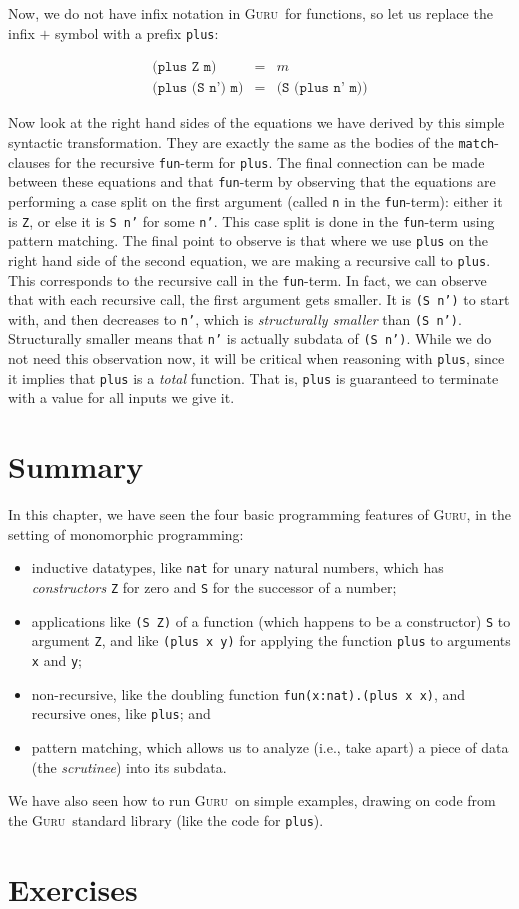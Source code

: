 \documentclass{book}[12pt]
\newcommand{\guru}[0]{\textsc{Guru}}
\begin{document}
\noindent Now, we do not have infix notation in \guru\ for functions,
so let us replace the infix $+$ symbol with a prefix \texttt{plus}:

\begin{eqnarray*}
\texttt{(plus Z m)} & = & m \\
\texttt{(plus (S n') m)} & = & \texttt{(S (plus n' m))}
\end{eqnarray*}

\noindent Now look at the right hand sides of the equations we have
derived by this simple syntactic transformation.  They are exactly the
same as the bodies of the \texttt{match}-clauses for the recursive
\texttt{fun}-term for \texttt{plus}.  The final connection can be made
between these equations and that \texttt{fun}-term by observing that
the equations are performing a case split on the first argument
(called \texttt{n} in the \texttt{fun}-term): either it is \texttt{Z},
or else it is \texttt{S n'} for some \texttt{n'}.  This case split is
done in the \texttt{fun}-term using pattern matching.  The final point
to observe is that where we use \texttt{plus} on the right hand side
of the second equation, we are making a recursive call to
\texttt{plus}.  This corresponds to the recursive call in the
\texttt{fun}-term.  In fact, we can observe that with each recursive
call, the first argument gets smaller.  It is \texttt{(S n')} to start
with, and then decreases to \texttt{n'}, which is \emph{structurally
smaller} than \texttt{(S n')}.  Structurally smaller means that
\texttt{n'} is actually subdata of \texttt{(S n')}.  While we do not
need this observation now, it will be critical when reasoning with
\texttt{plus}, since it implies that \texttt{plus} is a \emph{total}
function.  That is, \texttt{plus} is guaranteed to terminate with a
value for all inputs we give it.

\section{Summary}

In this chapter, we have seen the four basic programming features of
\guru, in the setting of monomorphic programming:
\begin{itemize}
\item inductive datatypes, like \texttt{nat} for unary natural
numbers, which has \emph{constructors} \texttt{Z} for zero and
\texttt{S} for the successor of a number;
\item applications like \texttt{(S Z)} of a function (which happens to be a constructor) \texttt{S} to argument \texttt{Z},
and like \texttt{(plus x y)} for applying the function \texttt{plus} to arguments \texttt{x} and \texttt{y};
\item non-recursive, like the doubling function \texttt{fun(x:nat).(plus x x)}, and recursive ones, like \texttt{plus}; and
\item pattern matching, which allows us to analyze (i.e., take apart)
a piece of data (the \emph{scrutinee}) into its subdata.
\end{itemize}

 \noindent We have also seen how to run \guru\ on simple examples,
drawing on code from the \guru\ standard library (like the code for
\texttt{plus}).

\section{Exercises}





\end{document}
